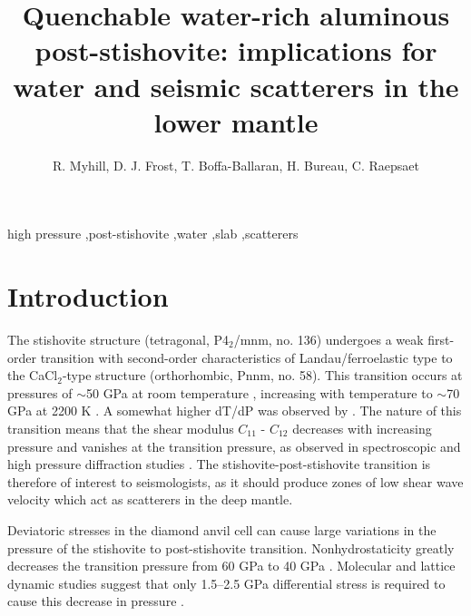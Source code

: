 \documentclass[review]{elsarticle}
\begin{document}
\begin{frontmatter}

\title{Quenchable water-rich aluminous post-stishovite: implications for water and seismic scatterers in the lower mantle}

\author{R. Myhill, D. J. Frost, T. Boffa-Ballaran, H. Bureau, C. Raepsaet}
\address{Bayerisches Geoinstitut, Universit\"{a}t Bayreuth, Universit\"{a}tsstrasse 30, 95447 Bayreuth, Germany}

\begin{abstract}

\end{abstract}

\begin{keyword}
high pressure \sep post-stishovite \sep water \sep slab \sep scatterers
\end{keyword}

\end{frontmatter}

\linenumbers

\section{Introduction}

The stishovite structure (tetragonal, P4$_2$/mnm, no. 136) undergoes a weak first-order transition \citep{AFGH1998, HSCHMK2000} with second-order characteristics of Landau/ferroelastic type \citep{TY1989, CHM2000} to the CaCl$_2$-type structure (orthorhombic, Pnnm, no. 58). This transition occurs at pressures of $\sim$50 GPa at room temperature \citep{KCHM1995, AFGH1998}, increasing with temperature to $\sim$70 GPa at 2200 K \citep{HTSO2005,Nomuraetal2010}. A somewhat higher dT/dP was observed by \cite{OHMI2002}. The nature of this transition means that the shear modulus $C_{11}$ - $C_{12}$ decreases with increasing pressure and vanishes at the transition pressure, as observed in spectroscopic and high pressure diffraction studies \citep{KCHM1995, SDL2002}. The stishovite-post-stishovite transition is therefore of interest to seismologists, as it should produce zones of low shear wave velocity which act as scatterers in the deep mantle.

Deviatoric stresses in the diamond anvil cell can cause large variations in the pressure of the stishovite to post-stishovite transition. Nonhydrostaticity greatly decreases the transition pressure from 60 GPa \citep{AAML2003, HSCHMK2000} to 40 GPa \citep{KMH1996, SAB2012}. Molecular and lattice dynamic studies suggest that only 1.5--2.5 GPa differential stress is required to cause this decrease in pressure \citep{DB1996}.
\end{document}
